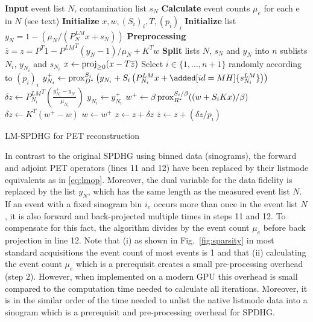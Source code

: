 \begin{algorithm}[t]
\begin{algorithmic}[1]
\small
\State \textbf{Input} event list $N$, contamination list $s_N$
\State \textbf{Calculate} event counts $\mu_e$ for each e in $N$ (see text)
\State \textbf{Initialize} $x,w,(S_i)_i,T,(p_i)_i$
\State \textbf{Initialize} list $y_{N} = 1 - (\mu_N /(P^{LM}_{N} x + s_{N}))$ 
\State \textbf{Preprocessing} $\overline{z} = z = {P^T} 1 - {P^{LM}}^T (y_N-1)/\mu_N + K^T w$ %
\State \textbf{Split} lists $N$, $s_N$ and $y_N$ into $n$ sublists $N_i$, $y_{N_i}$ and $s_{N_i}$
\Repeat
	\State $x \gets \operatorname{proj}_{\geq 0} (x - T \overline{z})$
	\State Select $i \in \{1,\ldots,n+1\}$ randomly according to $(p_i)_i$
	  \State $y_{N_i}^+ \gets \prox_{D^*}^{S_i} \left( y_{N_i} + S_i \left(P^{LM}_{N_i} x + \added[id=MH]{s^{LM}_{N_i}} \right) \right)$
	  \State $\delta z \gets {P^{LM}_{N_i}}^T \left(\frac{y_{N_i}^+ - y_{N_i}}{\mu_{N_i}}\right)$
	  \State $y_{N_i} \gets y_{N_i}^+$
  \Else
	  \State $w^+ \gets \beta \operatorname{prox}_{R^*}^{S_i/\beta} ((w + S_i  K x)/\beta)$
	  \State $\delta z \gets K^T \left(w^+ - w\right)$
	  \State $w \gets w^+$
  \EndIf
	\State $z \gets z + \delta z$
	\State $\overline{z} \gets  z + (\delta z/p_i)$
\State {}
\end{algorithmic}
\caption{LM-SPDHG for PET reconstruction}
\label{alg:lmspdhg}
\end{algorithm}


In contrast to the original SPDHG using binned data (sinograms), the forward and adjoint
PET operators (lines 11 and 12) have been replaced by their listmode equivalents as in \eqref{eq:lmop}.
Moreover, the dual variable for the data fidelity is replaced by the list $y_N$, which has the
same length as the measured event list $N$.
If an event with a fixed sinogram bin $i_e$ occurs more than once in the event list
$N$, it is also forward and back-projected multiple times in steps 11 and 12.
To compensate for this fact, the algorithm divides by the event count $\mu_e$ before back projection
in line 12.
Note that (i) as shown in Fig.~\ref{fig:sparsity} in most standard acquisitions the event count
of most events is 1 and that (ii) calculating the event count $\mu_e$ which is a prerequisit
creates a small pre-processing overhead (step 2).
However, when implemented on a modern GPU this overhead is small compared to the computation
time needed to calculate all iterations.
Moreover, it is in the similar order of the time needed to unlist the native listmode data into
a sinogram which is a prerequisit and pre-processing overhead for SPDHG.

